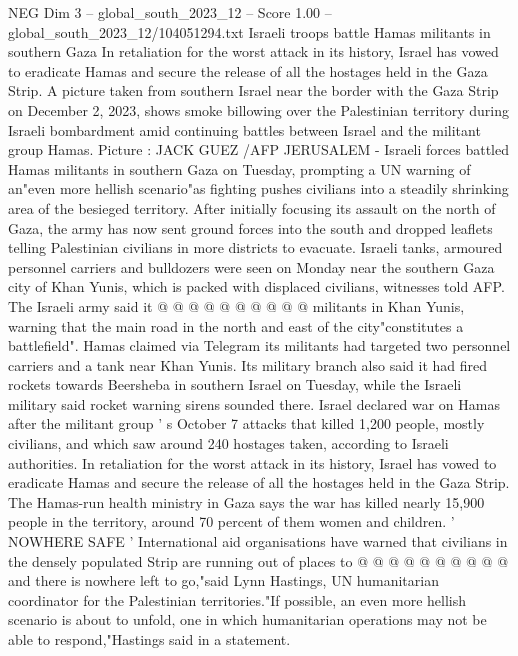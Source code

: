 \begin{textsample}{NEG Dim 3 – global\_south\_2023\_12 – Score 1.00 – global\_south\_2023\_12/104051294.txt}  \label{ex:f3_neg_003}
Israeli troops battle Hamas militants in southern Gaza In retaliation for the worst attack in its history, Israel has vowed to eradicate Hamas and secure the release of all the hostages held in the Gaza Strip.
A picture taken from southern Israel near the border with the Gaza Strip on December 2, 2023, shows smoke billowing over the Palestinian territory during Israeli bombardment amid continuing battles between Israel and the militant group Hamas.
Picture : JACK GUEZ /AFP JERUSALEM - Israeli forces battled Hamas militants in southern Gaza on Tuesday, prompting a UN warning of an"even more hellish scenario"as fighting pushes civilians into a steadily shrinking area of the besieged territory.
After initially focusing its assault on the north of Gaza, the army has now sent ground forces into the south and dropped leaflets telling Palestinian civilians in more districts to evacuate.
Israeli tanks, armoured personnel carriers and bulldozers were seen on Monday near the southern Gaza city of Khan Yunis, which is packed with displaced civilians, witnesses told AFP.
The Israeli army said it @ @ @ @ @ @ @ @ @ @ militants in Khan Yunis, warning that the main road in the north and east of the city"constitutes a battlefield".
Hamas claimed via Telegram its militants had targeted two personnel carriers and a tank near Khan Yunis.
Its military branch also said it had fired rockets towards Beersheba in southern Israel on Tuesday, while the Israeli military said rocket warning sirens sounded there.
Israel declared war on Hamas after the militant group ' s October 7 attacks that killed 1,200 people, mostly civilians, and which saw around 240 hostages taken, according to Israeli authorities.
In retaliation for the worst attack in its history, Israel has vowed to eradicate Hamas and secure the release of all the hostages held in the Gaza Strip.
The Hamas-run health ministry in Gaza says the war has killed nearly 15,900 people in the territory, around 70 percent of them women and children. ' NOWHERE SAFE ' International aid organisations have warned that civilians in the densely populated Strip are running out of places to @ @ @ @ @ @ @ @ @ @ and there is nowhere left to go,"said Lynn Hastings, UN humanitarian coordinator for the Palestinian territories."If possible, an even more hellish scenario is about to unfold, one in which humanitarian operations may not be able to respond,"Hastings said in a statement.

\end{textsample}
